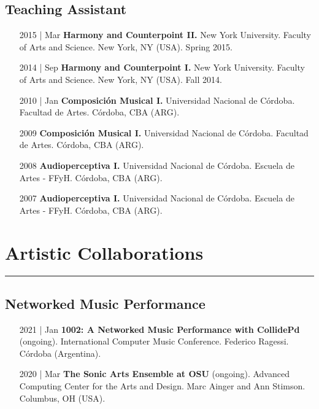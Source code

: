 \documentclass[12pt]{article}%
\begin{document}
\subsection{Teaching Assistant}%
\begin{itemize}[align=parleft,leftmargin=2.25cm,labelwidth=2cm]
\item[2015 | Mar]
\textbf{Harmony and Counterpoint II.}
New York University. 
Faculty of Arts and Science. 
New York, NY (USA). 
Spring 2015.
\end{itemize}%
\begin{itemize}[align=parleft,leftmargin=2.25cm,labelwidth=2cm]
\item[2014 | Sep]
\textbf{Harmony and Counterpoint I.}
New York University. 
Faculty of Arts and Science. 
New York, NY (USA). 
Fall 2014.
\end{itemize}%
\begin{itemize}[align=parleft,leftmargin=2.25cm,labelwidth=2cm]
\item[2010 | Jan]
\textbf{Composición Musical I.}
Universidad Nacional de Córdoba. 
Facultad de Artes. 
Córdoba, CBA (ARG). 
\end{itemize}%
\begin{itemize}[align=parleft,leftmargin=2.25cm,labelwidth=2cm]
\item[2009]
\textbf{Composición Musical I.}
Universidad Nacional de Córdoba. 
Facultad de Artes. 
Córdoba, CBA (ARG). 
\end{itemize}%
\begin{itemize}[align=parleft,leftmargin=2.25cm,labelwidth=2cm]
\item[2008]
\textbf{Audioperceptiva I.}
Universidad Nacional de Córdoba. 
Escuela de Artes {-} FFyH. 
Córdoba, CBA (ARG). 
\end{itemize}%
\begin{itemize}[align=parleft,leftmargin=2.25cm,labelwidth=2cm]
\item[2007]
\textbf{Audioperceptiva I.}
Universidad Nacional de Córdoba. 
Escuela de Artes {-} FFyH. 
Córdoba, CBA (ARG). 
\end{itemize}

%
\section{Artistic Collaborations}%
\label{sec:ArtisticCollaborations}%
\hrule%
\subsection{Networked Music Performance}%
\begin{itemize}[align=parleft,leftmargin=2.25cm,labelwidth=2cm]
\item[2021 | Jan]
\textbf{1002: A Networked Music Performance with CollidePd}
(ongoing). 
International Computer Music Conference. 
Federico Ragessi. 
Córdoba (Argentina). 
\end{itemize}%
\begin{itemize}[align=parleft,leftmargin=2.25cm,labelwidth=2cm]
\item[2020 | Mar]
\textbf{The Sonic Arts Ensemble at OSU}
(ongoing). 
Advanced Computing Center for the Arts and Design. 
Marc Ainger and Ann Stimson. 
Columbus, OH (USA). 
\end{itemize}%
\end{document}
